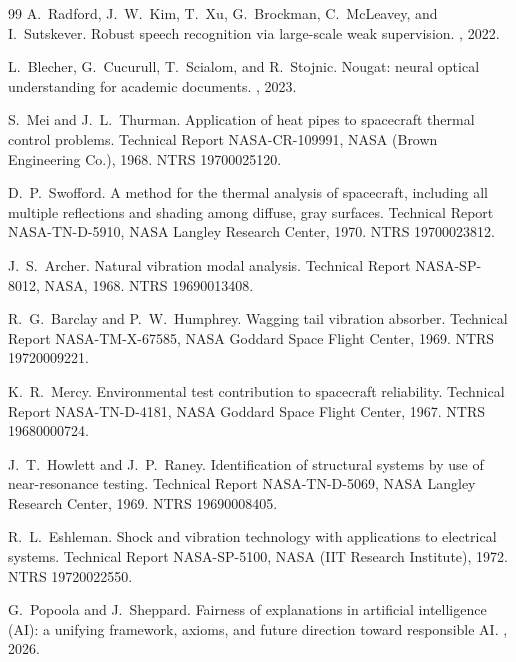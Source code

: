 \documentclass[11pt]{article}
\begin{document}
\begin{thebibliography}{99}
A.~Radford, J.~W.~Kim, T.~Xu, G.~Brockman, C.~McLeavey, and I.~Sutskever.
\newblock Robust speech recognition via large-scale weak supervision.
, 2022.

L.~Blecher, G.~Cucurull, T.~Scialom, and R.~Stojnic.
\newblock Nougat: neural optical understanding for academic documents.
, 2023.

S.~Mei and J.~L.~Thurman.
\newblock Application of heat pipes to spacecraft thermal control problems.
\newblock Technical Report NASA-CR-109991, NASA (Brown Engineering Co.), 1968.
\newblock NTRS 19700025120.

D.~P.~Swofford.
\newblock A method for the thermal analysis of spacecraft, including all multiple reflections and shading among diffuse, gray surfaces.
\newblock Technical Report NASA-TN-D-5910, NASA Langley Research Center, 1970.
\newblock NTRS 19700023812.

J.~S.~Archer.
\newblock Natural vibration modal analysis.
\newblock Technical Report NASA-SP-8012, NASA, 1968.
\newblock NTRS 19690013408.

R.~G.~Barclay and P.~W.~Humphrey.
\newblock Wagging tail vibration absorber.
\newblock Technical Report NASA-TM-X-67585, NASA Goddard Space Flight Center, 1969.
\newblock NTRS 19720009221.

K.~R.~Mercy.
\newblock Environmental test contribution to spacecraft reliability.
\newblock Technical Report NASA-TN-D-4181, NASA Goddard Space Flight Center, 1967.
\newblock NTRS 19680000724.

J.~T.~Howlett and J.~P.~Raney.
\newblock Identification of structural systems by use of near-resonance testing.
\newblock Technical Report NASA-TN-D-5069, NASA Langley Research Center, 1969.
\newblock NTRS 19690008405.

R.~L.~Eshleman.
\newblock Shock and vibration technology with applications to electrical systems.
\newblock Technical Report NASA-SP-5100, NASA (IIT Research Institute), 1972.
\newblock NTRS 19720022550.

G.~Popoola and J.~Sheppard.
\newblock Fairness of explanations in artificial intelligence ({AI}): a unifying framework, axioms, and future direction toward responsible {AI}.
, 2026.


\end{thebibliography}
\end{document}
